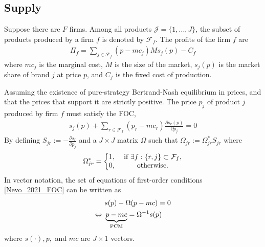 \documentclass[11pt]{elegantbook}
\begin{document}
\subsection{Supply}
Suppose there are $F$ firms. Among all products $\mathcal{J}=\{1,...,J\}$, the subset of products produced by a firm $f$ is denoted by $\mathcal{F}_f$. The profits of the firm $f$ are
\begin{equation}
    \begin{aligned}
        \Pi_f=\sum_{j\in \mathcal{F}_f}(p-mc_j)Ms_j(p)-C_f
    \end{aligned}
    \nonumber
\end{equation}
where $mc_j$ is the marginal cost, $M$ is the size of the market, $s_j(p)$ is the market share of brand $j$ at price $p$, and $C_f$ is the fixed cost of production.

Assuming the existence of pure-strategy Bertrand-Nash equilibrium in prices, and that the prices that support it are strictly positive. The price $p_j$ of product $j$ produced by firm $f$ must satisfy the FOC,
\begin{equation}
    \begin{aligned}
        s_j(p)+\sum_{r\in\mathcal{F}_f}(p_r-mc_r)\frac{\partial s_r(p)}{\partial p_j}=0
    \end{aligned}
    \label{Nevo_2021_FOC}
\end{equation}
By defining $S_{jr}:=-\frac{\partial s_r}{\partial p_j}$ and a $J\times J$ matrix $\Omega$ such that $\Omega_{jr}:=\Omega_{jr}^*S_{jr}$ where $$\Omega_{jr}^*=\left\{\begin{matrix}
    1,& \textnormal{ if }\exists f:\{r,j\}\subset \mathcal{F}_f,\\
    0,& \textnormal{ otherwise}.
\end{matrix}\right.$$
In vector notation, the set of equations of first-order conditions \eqref{Nevo_2021_FOC} can be written as
\begin{equation}
    \begin{aligned}
        &s(p)-\Omega(p-mc)=0\\
        \Leftrightarrow\ &\underbrace{p-mc}_\textnormal{PCM}=\Omega^{-1}s(p)
    \end{aligned}
    \nonumber
\end{equation}
where $s(\cdot),p,$ and $mc$ are $J\times 1$ vectors.
\end{document}
